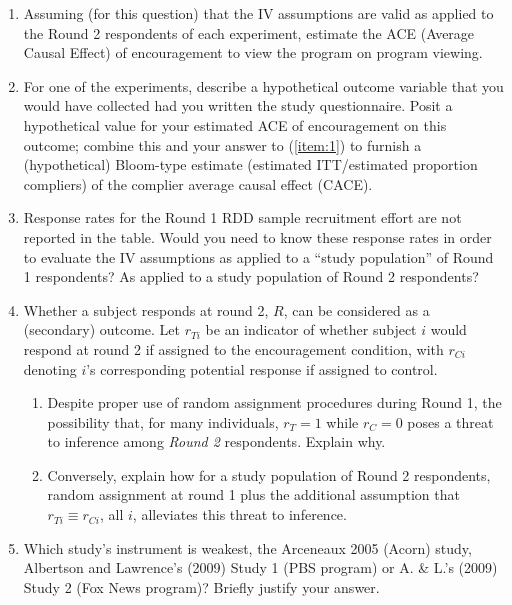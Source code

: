 \documentclass{article}
\begin{document}
\begin{enumerate}
\item \label{item:1}Assuming (for this question) that the IV assumptions are
     valid as applied to the Round 2 respondents of each experiment, estimate
     the ACE (Average Causal Effect) of encouragement to view the program on program viewing.
\item For one of the experiments, describe a hypothetical outcome variable that
     you would have collected had you written the study questionnaire. Posit a
     hypothetical value for your estimated ACE of encouragement on this outcome;
     combine this and your answer to (\ref{item:1}) to furnish a (hypothetical)
     Bloom-type estimate (estimated ITT/estimated proportion compliers) of the complier average causal effect (CACE).
\item Response rates for the Round 1 RDD sample recruitment effort are not reported in the table. Would you need to know these response rates in order to evaluate the IV assumptions as applied to a ``study population'' of Round 1 respondents?  As applied to a study population of Round 2 respondents?
\item Whether a subject responds at round 2, $R$, can be considered as a (secondary) outcome. Let $r_{Ti}$ be an indicator of whether subject $i$ would respond at round 2 if assigned to the encouragement condition, with $r_{Ci}$ denoting $i$'s corresponding potential response if assigned to control.
  \begin{enumerate}
  \item Despite proper use of random assignment procedures during Round 1, the possibility that, for many individuals, $r_{T}=1$ while $r_{C}=0$ poses a threat to inference among \textit{Round 2} respondents. Explain why.
  \item Conversely, explain how for a study population of Round 2 respondents, random assignment at round 1 plus the additional assumption that $r_{Ti} \equiv r_{Ci}$, all $i$, alleviates this threat to inference.
  \end{enumerate}
\item Which study's instrument is weakest, the Arceneaux 2005 (Acorn) study, Albertson and Lawrence's (2009) Study 1 (PBS program) or A. \& L.'s (2009) Study 2 (Fox News program)? Briefly justify your answer.
\end{enumerate}
\end{document}
